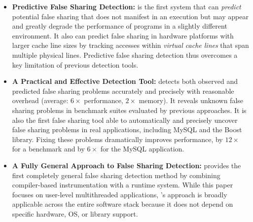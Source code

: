 \begin{itemize}


\item
\textbf{Predictive False Sharing Detection:} \Predator{} is the first system that can \emph{predict} potential false sharing that does not manifest in an execution but may appear and greatly degrade the performance of programs in a slightly different environment. 
It also can predict false sharing in hardware platforms with larger cache line sizes by tracking accesses within \emph{virtual cache lines} that span multiple physical lines. Predictive false sharing detection thus overcomes a key limitation of previous detection tools.



\item
\textbf{A Practical and Effective Detection Tool:} \Predator{} detects both observed and predicted false sharing 
problems accurately and precisely with reasonable overhead (average: $6\times$ performance, $2\times$ memory).  It reveals unknown false sharing problems in benchmark suites evaluated by previous approaches. It is also the first false sharing tool able to automatically and precisely uncover
false sharing problems in real applications, including 
MySQL and the Boost library. Fixing these problems 
dramatically improves performance, by $12\times$ for a benchmark and by $6\times$ for the MySQL application.


\item
\textbf{A Fully General Approach to False Sharing Detection:} \Predator{} provides the first completely general false sharing detection method by combining compiler-based instrumentation with a runtime system. While this
paper focuses on user-level multithreaded applications, \Predator{}'s approach is broadly applicable across the entire software stack because it does not depend on specific hardware, OS, or library support.


\end{itemize}
